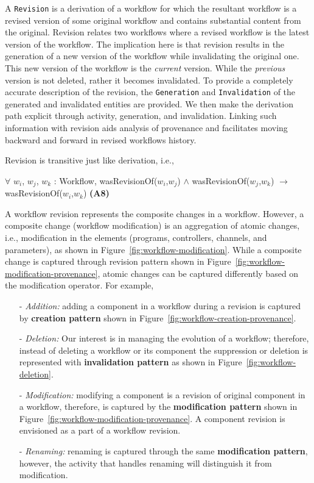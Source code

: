 \documentclass[ao]{iosart2x}
\begin{document}
A \texttt{Revision} is a derivation of a workflow for which the resultant workflow is a revised version of some original workflow and contains substantial content from the original. %
Revision relates two workflows where a revised workflow is the latest version of the workflow. The implication here is that revision results in the generation of a new version of the workflow while invalidating the original one. This new version of the workflow is the \textit{current} version. While the \textit{previous} version is not deleted, rather it becomes invalidated. To provide a completely accurate description of the revision, the \texttt{Generation} and \texttt{Invalidation} of the generated and invalidated entities are provided. We then make the derivation path explicit through activity, generation, and invalidation. Linking such information with revision aids analysis of provenance and facilitates moving backward and forward in revised workflows history.

Revision is transitive just like derivation, i.e.,   
\begin{center}
    $\forall$ $w_i$, $w_j$, $w_k$ : Workflow,
    wasRevisionOf($w_i$,$w_j$) $\wedge$ wasRevisionOf($w_j$,$w_k$) $\rightarrow$ wasRevisionOf($w_i$,$w_k$) \textbf{(A8)}
\end{center}


A workflow revision represents the composite changes in a workflow. However, a composite change (workflow modification) is an aggregation of atomic changes, i.e., modification in the elements (programs, controllers, channels, and parameters), as shown in Figure~\ref{fig:workflow-modification}. 
While a composite change is captured through revision pattern shown in Figure~\ref{fig:workflow-modification-provenance}, atomic changes can be captured differently based on the modification operator. For example,

\begin{itemize}
\item[-] \textit{Addition:} adding a component in a workflow during a revision is captured by \textbf{creation pattern} shown in Figure~\ref{fig:workflow-creation-provenance}.
\item[-] \textit{Deletion:} Our interest is in managing the evolution of a workflow; therefore, instead of deleting a workflow or its component the suppression or deletion is represented with \textbf{invalidation pattern} as shown in Figure~\ref{fig:workflow-deletion}. 
\item[-] \textit{Modification:} modifying a component is a revision of original component in a workflow, therefore, is captured by the \textbf{modification pattern} shown in Figure~\ref{fig:workflow-modification-provenance}. A component revision is envisioned as a part of a workflow revision.
\item[-] \textit{Renaming:} renaming is captured through the same \textbf{modification pattern}, however, the activity that handles renaming will distinguish it from modification. 
\end{itemize}
\end{document}
